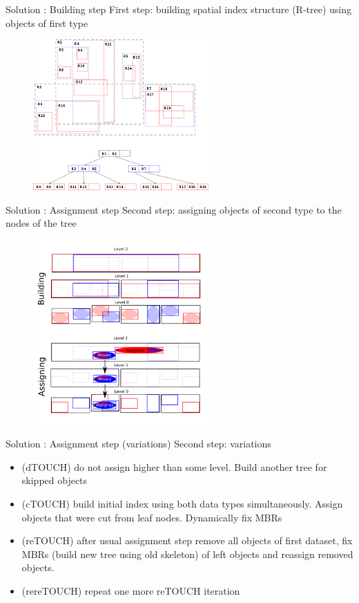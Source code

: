 \documentclass{beamer}
\begin{document}
\begin{frame}{Solution : Building step}
First step: building spatial index structure (R-tree) using objects of first type
\begin{figure}[p]
    \centering
    \includegraphics[width=0.6\textwidth]{Images/3dRtree.png}
\end{figure}
\end{frame}
\begin{frame}{Solution : Assignment step}
Second step: assigning objects of second type to the nodes of the tree
\begin{figure}[p]
    \centering
    \includegraphics[width=0.6\textwidth]{Images/cTOUCHexplain.png}
\end{figure}
\end{frame}
\begin{frame}{Solution : Assignment step (variations)}
Second step: variations
\begin{itemize}
\item (dTOUCH) do not assign higher than some level. Build another tree for skipped objects
\item (cTOUCH) build initial index using both data types simultaneously. Assign objects that were cut from leaf nodes. Dynamically fix MBRs
\item (reTOUCH) after usual assignment step remove all objects of first dataset, fix MBRs (build new tree using old skeleton) of left objects and reassign removed objects. 
\item (rereTOUCH) repeat one more reTOUCH iteration
\end{itemize}
\end{frame}
\end{document}
